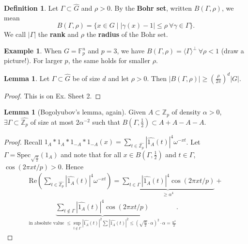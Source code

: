 \documentclass{article}
\theoremstyle{definition}
\newtheorem{lemma}[theorem]{Lemma}
\newtheorem{example}[theorem]{Example}
\newtheorem{defn}[theorem]{Definition}
\begin{document}
\begin{defn}
    Let $\Gamma \subset \widehat{G}$ and $\rho>0$. By the \textbf{Bohr set}, written $B(\Gamma,\rho)$, we mean \[
    B(\Gamma,\rho) = \{x \in G \mid \left|\gamma(x)-1 \right|\le \rho ~\forall \gamma \in \Gamma\}.
    \]
    We call $\left|\Gamma \right|$ the \textbf{rank} and $\rho$ the \textbf{radius} of the Bohr set.
\end{defn}
\begin{example}
    When $G = \mathbb{F}_p^n$ and $p = 3$, we have $B(\Gamma,\rho) = \langle \Gamma \rangle^\perp ~\forall \rho<1$ (draw a picture!). For larger $p$, the same holds for smaller $\rho$.
\end{example}
\begin{lemma}
    Let $\Gamma \subset \widehat{G}$ be of size $d$ and let $\rho > 0$. Then $\left|B(\Gamma,\rho) \right| \ge \left(\frac{\rho}{2\pi}\right)^d\left|G \right|$.
\end{lemma}
\begin{proof}
    This is on Ex. Sheet 2.
\end{proof}
\begin{lemma}[Bogolyubov's lemma, again]
    Given $A \subset \mathbb{Z}_p$ of density $\alpha > 0$, $\exists \Gamma \subset \widehat{\mathbb{Z}_p}$ of size at most $2\alpha^{-2}$ such that $B\left(\Gamma,\frac{1}{2}\right) \subset A + A - A - A$.
\end{lemma}
\begin{proof}
    Recall $1_A * 1_A * 1_{-A} * 1_{-A}(x) = \sum_{t \in \widehat{\mathbb{Z}_p}}^{} \left|\widehat{1_A}(t) \right|^4 \omega^{-xt}$. Let $\Gamma = \text{Spec}_{\sqrt{\frac{\alpha}{2}}}(1_A)$ and note that for all $x \in B\left(\Gamma,\frac{1}{2}\right)$ and $t \in \Gamma$, $\cos(2\pi xt/p)>0$. Hence 
    \begin{align*}
        \text{Re}\left(\sum_{t \in \widehat{\mathbb{Z}_p}}^{} \left|\widehat{1_A}(t) \right|^4\omega^{-xt}\right) = \underbrace{\sum_{t \in \Gamma}^{} \left|\widehat{1_A}(t) \right|^4 \cos \left(2\pi xt/p\right)}_{\ge \alpha^4} + \\
        \underbrace{\sum_{t \not\in \Gamma}^{} \left|\widehat{1_A}(t) \right|^4 \cos(2\pi xt/p)}_{\text{in absolute value }\le \sup_{t \not\in \Gamma}\left|\widehat{1_A}(t) \right|^2\sum_{}^{} \left|\widehat{1_A}(t) \right|^2 \le \left(\sqrt{\frac{\alpha}{2}}\cdot \alpha\right)^2\cdot \alpha =\frac{\alpha^4}{2}}.
    \end{align*}
\end{proof}
\end{document}
